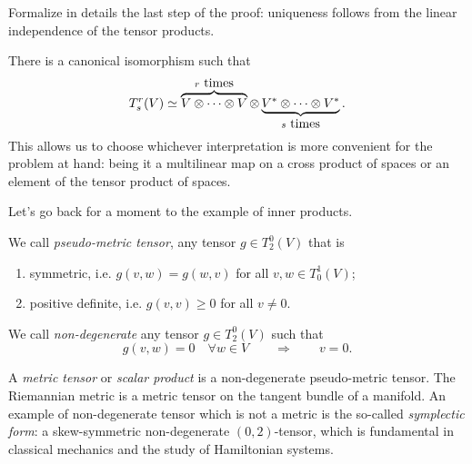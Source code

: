 \begin{exercise}
Formalize in details the last step of the proof: uniqueness follows from the linear independence of the tensor products.
\end{exercise}

\begin{remark}
  There is a canonical isomorphism such that
  \begin{equation}
    T^r_s(V) \simeq \LaTeXoverbrace{V\otimes \cdots \otimes V}^{r\mbox{ times}} \otimes \LaTeXunderbrace{V^*\otimes \cdots \otimes V^*}_{s\mbox{ times}}.
  \end{equation}
  This allows us to choose whichever interpretation is more convenient for the problem at hand: being it a multilinear map on a cross product of spaces or an element of the tensor product of spaces.
\end{remark}


Let's go back for a moment to the example of inner products.

\begin{definition}\label{def:metric}
  We call \emph{pseudo-metric tensor}, any tensor $g\in T_2^0(V)$ that is
  \begin{enumerate}
    \item symmetric, i.e. $g(v,w) = g(w,v)$ for all $v,w\in T_0^1(V)$;
    \item positive definite, i.e. $g(v,v)\geq0$ for all $v\neq 0$.
  \end{enumerate}
  
  We call \emph{non-degenerate} any tensor $g\in T_2^0(V)$ such that
  \begin{equation}
    g(v,w) = 0 \quad\forall w\in V \qquad\Longrightarrow\qquad v=0.
  \end{equation}
  
  A \emph{metric tensor} or \emph{scalar product} is a non-degenerate pseudo-metric tensor.
  The Riemannian metric is a metric tensor on the tangent bundle of a manifold.
  An example of non-degenerate tensor which is not a metric is the so-called \emph{symplectic form}: a skew-symmetric non-degenerate $(0,2)$-tensor, which is fundamental in classical mechanics and the study of Hamiltonian systems.
\end{definition}

